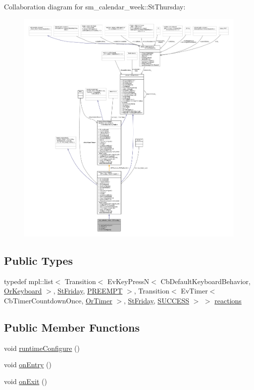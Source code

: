 Collaboration diagram for sm\+\_\+calendar\+\_\+week\+:\+:St\+Thursday\+:
\nopagebreak
\begin{figure}[H]
\begin{center}
\leavevmode
\includegraphics[width=350pt]{structsm__calendar__week_1_1StThursday__coll__graph}
\end{center}
\end{figure}
\subsection*{Public Types}
\begin{DoxyCompactItemize}
\item 
typedef mpl\+::list$<$ Transition$<$ Ev\+Key\+PressN$<$ Cb\+Default\+Keyboard\+Behavior, \hyperlink{classsm__calendar__week_1_1OrKeyboard}{Or\+Keyboard} $>$, \hyperlink{structsm__calendar__week_1_1StFriday}{St\+Friday}, \hyperlink{classPREEMPT}{P\+R\+E\+E\+M\+PT} $>$, Transition$<$ Ev\+Timer$<$ Cb\+Timer\+Countdown\+Once, \hyperlink{classsm__calendar__week_1_1OrTimer}{Or\+Timer} $>$, \hyperlink{structsm__calendar__week_1_1StFriday}{St\+Friday}, \hyperlink{classSUCCESS}{S\+U\+C\+C\+E\+SS} $>$ $>$ \hyperlink{structsm__calendar__week_1_1StThursday_a01b39d7646f8e0d4dba1fd189914951f}{reactions}
\end{DoxyCompactItemize}
\subsection*{Public Member Functions}
\begin{DoxyCompactItemize}
\item 
void \hyperlink{structsm__calendar__week_1_1StThursday_a39b3ce105c15a814a3f4a01ad439ceb3}{runtime\+Configure} ()
\item 
void \hyperlink{structsm__calendar__week_1_1StThursday_a7146517f179440d55821f77f20d76847}{on\+Entry} ()
\item 
void \hyperlink{structsm__calendar__week_1_1StThursday_a408fe6ad389605cec9309abf08899319}{on\+Exit} ()
\end{DoxyCompactItemize}
